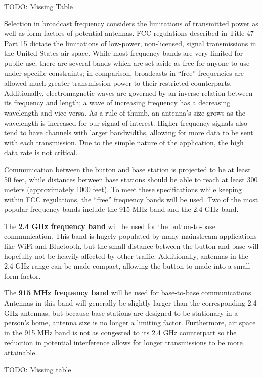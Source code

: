 \documentclass[journal]{IEEEtran}
\begin{document}
TODO: Missing Table

Selection in broadcast frequency considers the limitations of transmitted power as well as form factors of potential antennas.  FCC regulations described in Title 47 Part 15 dictate the limitations of low-power, non-licensed, signal transmissions in the United States air space.  While most frequency bands are very limited for public use, there are several bands which are set aside as free for anyone to use under specific constraints; in comparison, broadcasts in “free” frequencies are allowed much greater transmission power to their restricted counterparts.  Additionally, electromagnetic waves are governed by an inverse relation between its frequency and length; a wave of increasing frequency has a decreasing wavelength and vice versa.  As a rule of thumb, an antenna’s size grows as the wavelength is increased for our signal of interest. Higher frequency signals also tend to have channels with larger bandwidths, allowing for more data to be sent with each transmission.  Due to the simple nature of the application, the high data rate is not critical.

Communication between the button and base station is projected to be at least 50 feet, while distances between base stations should be able to reach at least 300 meters (approximately 1000 feet).  To meet these specifications while keeping within FCC regulations, the “free” frequency bands will be used. Two of the most popular frequency bands include the 915 MHz band and the 2.4 GHz band.

The \textbf{2.4 GHz frequency band} will be used for the button-to-base communication. This band is hugely populated by many mainstream applications like WiFi and Bluetooth, but the small distance between the button and base will hopefully not be heavily affected by other traffic. Additionally, antennas in the 2.4 GHz range can be made compact, allowing the button to made into a small form factor.

The \textbf{915 MHz frequency band} will be used for base-to-base communications.  Antennas in this band will generally be slightly larger than the corresponding 2.4 GHz antennas, but because base stations are designed to be stationary in a person’s home, antenna size is no longer a limiting factor.  Furthermore, air space in the 915 MHz band is not as congested to its 2.4 GHz counterpart so the reduction in potential interference allows for longer transmissions to be more attainable.

TODO: Missing table
\end{document}
